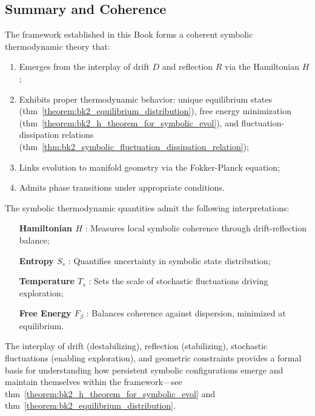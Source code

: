 \subsection{Summary and Coherence}
\label{subsec:bk2_summary_interpretive_framework}

\begin{theorem} 
\label{theorem:bk2_coherence_of_symbolic_therm} 
The framework established in this Book forms a coherent symbolic thermodynamic theory that:
\begin{enumerate}
    \item Emerges from the interplay of drift $D$ and reflection $R$ via the Hamiltonian $H$;
    \item Exhibits proper thermodynamic behavior: unique equilibrium states (thm~\ref{theorem:bk2_equilibrium_distribution}), free energy minimization (thm~\ref{theorem:bk2_h_theorem_for_symbolic_evol}), and fluctuation-dissipation relations (thm~\ref{thm:bk2_symbolic_fluctuation_dissipation_relation});
    \item Links evolution to manifold geometry via the Fokker-Planck equation;
    \item Admits phase transitions under appropriate conditions.
\end{enumerate}
\end{theorem}

\begin{corollary} 
\label{corollary:bk2_interpretative_framework} 
The symbolic thermodynamic quantities admit the following interpretations:
\begin{enumerate}
    \item[\textbf{Hamiltonian $H$}]: Measures local symbolic coherence through drift-reflection balance;
    \item[\textbf{Entropy $S_s$}]: Quantifies uncertainty in symbolic state distribution;
    \item[\textbf{Temperature $T_s$}]: Sets the scale of stochastic fluctuations driving exploration;
    \item[\textbf{Free Energy $F_\beta$}]: Balances coherence against dispersion, minimized at equilibrium.
\end{enumerate}
\end{corollary}

\begin{theorem} 
\label{thm:bk2_emergence_structure_symb_thermo} 
The interplay of drift (destabilizing), reflection (stabilizing), stochastic fluctuations (enabling exploration), and geometric constraints provides a formal basis for understanding how persistent symbolic configurations emerge and maintain themselves within the framework—see thm~\ref{theorem:bk2_h_theorem_for_symbolic_evol} and thm~\ref{theorem:bk2_equilibrium_distribution}.
\end{theorem}

